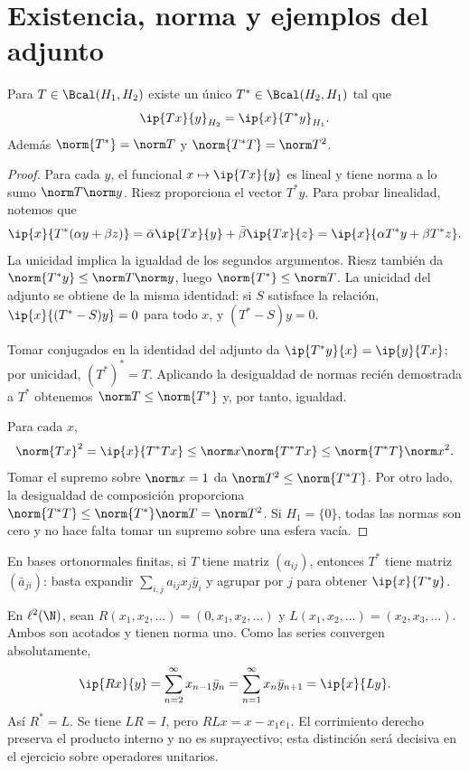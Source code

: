 \section{Existencia, norma y ejemplos del adjunto}
\begin{teorema}\label{ch32:adjunto}
Para $T\in\Bcal(H_1,H_2)$ existe un único $T^*\in\Bcal(H_2,H_1)$ tal que
\[
 \ip{Tx}{y}_{H_2}=\ip{x}{T^*y}_{H_1}.
\]
Además $\norm{T^*}=\norm T$ y $\norm{T^*T}=\norm T^2$.
\end{teorema}
\begin{proof}
Para cada $y$, el funcional $x\mapsto\ip{Tx}{y}$ es lineal y tiene norma a lo sumo $\norm T\norm y$. Riesz proporciona el vector $T^*y$. Para probar linealidad, notemos que
\[
 \ip{x}{T^*(\alpha y+\beta z)}
 =\bar\alpha\ip{Tx}{y}+\bar\beta\ip{Tx}{z}
 =\ip{x}{\alpha T^*y+\beta T^*z}.
\]
La unicidad implica la igualdad de los segundos argumentos. Riesz también da $\norm{T^*y}\leq\norm T\norm y$, luego $\norm{T^*}\leq\norm T$. La unicidad del adjunto se obtiene de la misma identidad: si $S$ satisface la relación, $\ip{x}{(T^*-S)y}=0$ para todo $x$, y $(T^*-S)y=0$.

Tomar conjugados en la identidad del adjunto da $\ip{T^*y}{x}=\ip{y}{Tx}$; por unicidad, $(T^*)^*=T$. Aplicando la desigualdad de normas recién demostrada a $T^*$ obtenemos $\norm T\leq\norm{T^*}$ y, por tanto, igualdad.

Para cada $x$,
\[
 \norm{Tx}^{2}=\ip{x}{T^*Tx}\leq\norm x\norm{T^*Tx}
 \leq\norm{T^*T}\norm x^{2}.
\]
Tomar el supremo sobre $\norm x=1$ da $\norm T^{2}\leq\norm{T^*T}$. Por otro lado, la desigualdad de composición proporciona
$\norm{T^*T}\leq\norm{T^*}\norm T=\norm T^{2}$. Si $H_1=\{0\}$, todas las normas son cero y no hace falta tomar un supremo sobre una esfera vacía.
\end{proof}

\begin{ejemplo}
En bases ortonormales finitas, si $T$ tiene matriz $(a_{ij})$, entonces $T^*$ tiene matriz $(\bar a_{ji})$: basta expandir $\sum_{i,j}a_{ij}x_j\bar y_i$ y agrupar por $j$ para obtener $\ip{x}{T^*y}$.

En $\ell^{2}(\N)$, sean $R(x_1,x_2,\dots)=(0,x_1,x_2,\dots)$ y $L(x_1,x_2,\dots)=(x_2,x_3,\dots)$. Ambos son acotados y tienen norma uno. Como las series convergen absolutamente,
\[
 \ip{Rx}{y}=\sum_{n=2}^{\infty}x_{n-1}\bar y_n
 =\sum_{n=1}^{\infty}x_n\bar y_{n+1}=\ip{x}{Ly}.
\]
Así $R^*=L$. Se tiene $LR=I$, pero $RLx=x-x_1e_1$. El corrimiento derecho preserva el producto interno y no es suprayectivo; esta distinción será decisiva en el ejercicio sobre operadores unitarios.
\end{ejemplo}


